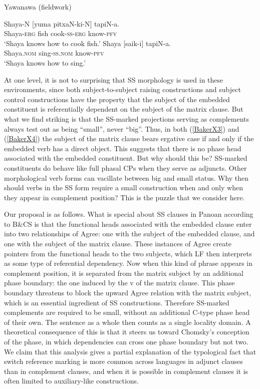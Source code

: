 \documentclass[output=paper]{langscibook}
\begin{document}
\begin{exe}
    \ex Yawanawa (fieldwork) \label{BakerX4}
	    \begin{xlist}
			\ex \label{BakerX4a}
			\gll Shaya-N [yuma pitxaN-ki-N] tapiN-a.\\
			     Shaya-\textsc{erg} fish cook-\textsc{ss-erg} know-\textsc{pfv}\\
			    \glt `Shaya knows how to cook fish.'
			\ex \label{BakerX4b}
			\gll Shaya [saik-i] tapiN-a.\\
    			 Shaya.\textsc{nom} sing-\textsc{ss.nom} know-\textsc{pfv}\\
			    \glt `Shaya knows how to sing.'
		\end{xlist}
\end{exe}

At one level, it is not to surprising that SS morphology is used in these environments, since both subject-to-subject raising constructions and subject control constructions have the property that the subject of the embedded constituent is referentially dependent on the subject of the matrix clause. But what we find striking is that the SS-marked projections serving as complements always test out as being “small”, never “big”. Thus, in both (\ref{BakerX3}) and (\ref{BakerX4}) the subject of the matrix clause bears ergative case if and only if the embedded verb has a direct object. This suggests that there is no phase head associated with the embedded constituent. But why should this be? SS-marked constituents do behave like full phasal CPs when they serve as adjuncts. Other morphological verb forms can vacillate between big and small status. Why then should verbs in the SS form require a small construction when and only when they appear in complement position? This is the puzzle that we consider here.

Our proposal is as follows. What is special about SS clauses in Panoan according to B\&CS is that the functional heads associated with the embedded clause enter into two relationships of Agree: one with the subject of the embedded clause, and one with the subject of the matrix clause. These instances of Agree create pointers from the functional heads to the two subjects, which LF then interprets as some type of referential dependency. Now when this kind of phrase appears in complement position, it is separated from the matrix subject by an additional phase boundary: the one induced by the v of the matrix clause. This phase boundary threatens to block the upward Agree relation with the matrix subject, which is an essential ingredient of SS constructions. Therefore SS-marked complements are required to be small, without an additional C-type phase head of their own. The sentence as a whole then counts as a single locality domain. A theoretical consequence of this is that it steers us toward Chomsky’s \citeyearpar{chomsky2001derivation} conception of the phase, in which dependencies can cross one phase boundary but not two. We claim that this analysis gives a partial explanation of the typological fact that switch reference marking is more common across languages in adjunct clauses than in complement clauses, and when it is possible in complement clauses it is often limited to auxiliary-like constructions.
\end{document}
